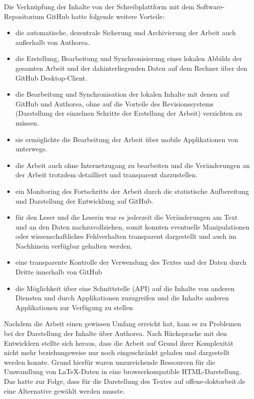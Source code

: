 Die Verknüpfung der Inhalte von der Schreibplattform mit dem Software-Repositorium GitHub hatte folgende weitere Vorteile:
\begin{itemize}
\item die automatische, dezentrale Sicherung und Archivierung der Arbeit auch außerhalb von Authorea.
\item die Erstellung, Bearbeitung und Synchronisierung eines lokalen Abbilds der gesamten Arbeit und der dahinterliegenden Daten auf dem Rechner über den GitHub Desktop-Client.
\item die Bearbeitung und Synchronisation der lokalen Inhalte mit denen auf GitHub und Authorea, ohne auf die Vorteile des Revisionssystems (Darstellung der einzelnen Schritte der Erstellung der Arbeit) verzichten zu müssen.
\item sie ermöglichte die Bearbeitung der Arbeit über mobile Applikationen von unterwegs.
\item die Arbeit auch ohne Internetzugang zu bearbeiten und die Veränderungen an der Arbeit trotzdem detailliert und transparent darzustellen.
\item ein Monitoring des Fortschritts der Arbeit durch die statistische Aufbereitung und Darstellung der Entwicklung auf GitHub.
\item für den Leser und die Leserin war es jederzeit die Veränderungen am Text und an den Daten nachzuvollziehen, somit konnten eventuelle Manipulationen oder wissenschaftliches Fehlverhalten transparent dargestellt und auch im Nachhinein verfügbar gehalten werden.
\item eine transparente Kontrolle der Verwendung des Textes und der Daten durch Dritte innerhalb von GitHub
\item die Möglichkeit über eine Schnittstelle (API) auf die Inhalte von anderen Diensten und durch Applikationen zuzugreifen und die Inhalte anderen Applikationen zur Verfügung zu stellen
\end{itemize}

Nachdem die Arbeit einen gewissen Umfang erreicht hat, kam es zu Problemen bei der Darstellung der Inhalte über Authorea. Nach Rücksprache mit den Entwicklern stellte sich heraus, dass die Arbeit auf Grund ihrer Komplexität nicht mehr beziehungsweise nur noch eingeschränkt geladen und dargestellt werden konnte. Grund hierfür waren unzureichende Ressourcen für die Umwandlung von LaTeX-Daten in eine browserkompatible HTML-Darstellung. Das hatte zur Folge, dass für die Darstellung des Textes auf offene-doktorbeit.de eine Alternative gewählt werden musste.

